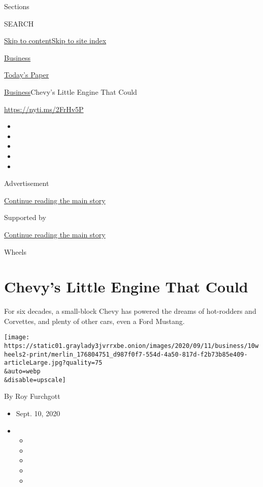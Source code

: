 Sections

SEARCH

\protect\hyperlink{site-content}{Skip to
content}\protect\hyperlink{site-index}{Skip to site index}

\href{https://www.nytimes3xbfgragh.onion/section/business}{Business}

\href{https://myaccount.nytimes3xbfgragh.onion/auth/login?response_type=cookie\&client_id=vi}{}

\href{https://www.nytimes3xbfgragh.onion/section/todayspaper}{Today's
Paper}

\href{/section/business}{Business}\textbar{}Chevy's Little Engine That
Could

\url{https://nyti.ms/2FrHv5P}

\begin{itemize}
\item
\item
\item
\item
\item
\end{itemize}

Advertisement

\protect\hyperlink{after-top}{Continue reading the main story}

Supported by

\protect\hyperlink{after-sponsor}{Continue reading the main story}

Wheels

\hypertarget{chevys-little-engine-that-could}{%
\section{Chevy's Little Engine That
Could}\label{chevys-little-engine-that-could}}

For six decades, a small-block Chevy has powered the dreams of
hot-rodders and Corvettes, and plenty of other cars, even a Ford
Mustang.

\texttt{[image: https://static01.graylady3jvrrxbe.onion/images/2020/09/11/business/10wheels2-print/merlin\_176804751\_d987f0f7-554d-4a50-817d-f2b73b85e409-articleLarge.jpg?quality=75\\\&auto=webp\\\&disable=upscale]}

By Roy Furchgott

\begin{itemize}
\item
  Sept. 10, 2020
\item
  \begin{itemize}
  \item
  \item
  \item
  \item
  \item
  \end{itemize}
\end{itemize}

